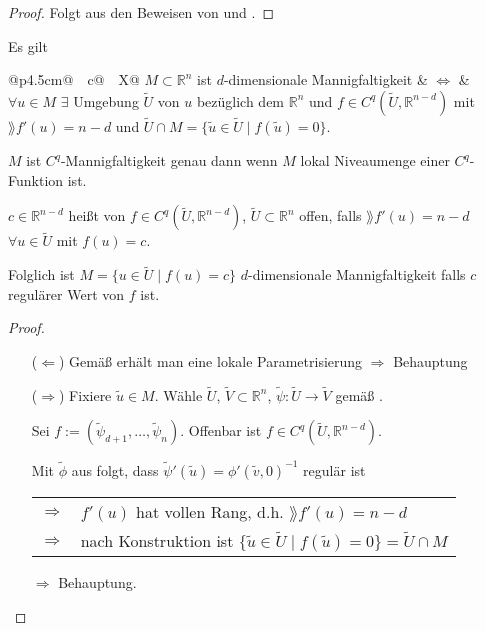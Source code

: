 \begin{proof}
	Folgt aus den Beweisen von  und .
\end{proof}

\begin{proposition}
	Es gilt
	
	\begin{tabularx}{\linewidth}{@{}p{4.5cm}@{\ \ }c@{\ \ }X@{}}
		$M\subset\mathbb{R}^{n}$ ist $d$-dimensionale Mannigfaltigkeit & $\Leftrightarrow$ & $\forall u\in M$ $\exists$ Umgebung $\tilde{U}$ von $u$ bezüglich dem $\mathbb{R}^n$ und $f\in C^q( \tilde{U}, \mathbb{R}^{n-d})$ mit $\rang f'(u) = n-d$ und $\tilde{U}\cap M = \{ \tilde{u}\in \tilde{U} \mid f(\tilde{u}) = 0 \}$.
	\end{tabularx}

\begin{underlinedenvironment}[Somit]
	$M$ ist $C^q$-Mannigfaltigkeit genau dann wenn $M$ lokal Niveaumenge einer $C^q$-Funktion ist.
\end{underlinedenvironment}
\end{proposition}

\begin{*definition}
	$c\in \mathbb{R}^{n-d}$ heißt  von $f\in C^q(\tilde{U}, \mathbb{R}^{n-d})$, $\tilde{U}\subset \mathbb{R}^n$ offen, falls $\rang f'(u) = n - d$ $\forall u\in\tilde{U}$ mit $f(u) = c$.
	
	Folglich ist $M = \{ u\in\tilde{U} \mid f(u) = c \}$ $d$-dimensionale Mannigfaltigkeit falls $c$ regulärer Wert von $f$ ist.
\end{*definition}
\begin{proof}\hspace*{0pt}
	\vspace*{\dimexpr-\baselineskip+1mm\relax}
	\begin{itemize}
		\item[($\Leftarrow$)] Gemäß  erhält man eine lokale Parametrisierung $\Rightarrow$ Behauptung
		\item[($\Rightarrow$)] Fixiere $\tilde{u}\in M$. Wähle $\tilde{U}$, $\tilde{V}\subset \mathbb{R}^n$, $\tilde{\psi}\!:\tilde{U}\to\tilde{V}$ gemäß .
		
		Sei $f:= ( \tilde{\psi}_{d+1}, \dotsc, \tilde{\psi}_n)$. Offenbar ist $f\in C^q(\tilde{U}, \mathbb{R}^{n-d})$.
		
		Mit $\tilde{\phi}$ aus  folgt, dass $\tilde{\psi}'(\tilde{u}) = \phi'(\tilde{v}, 0)^{-1}$ regulär ist\par
		\vspace*{-\parskip}
		\begin{tabularx}{\linewidth}{r@{\ \ }X}
			$\Rightarrow$ & $f'(u)$ hat vollen Rang, d.h. $\rang f'(u) = n - d$ \\
			$\Rightarrow$ & nach Konstruktion ist $\{ \tilde{u} \in \tilde{U}\mid f(\tilde{u}) = 0 \} = \tilde{U}\cap M$
		\end{tabularx}
		$\Rightarrow$ Behauptung.
	\end{itemize}
\end{proof}

